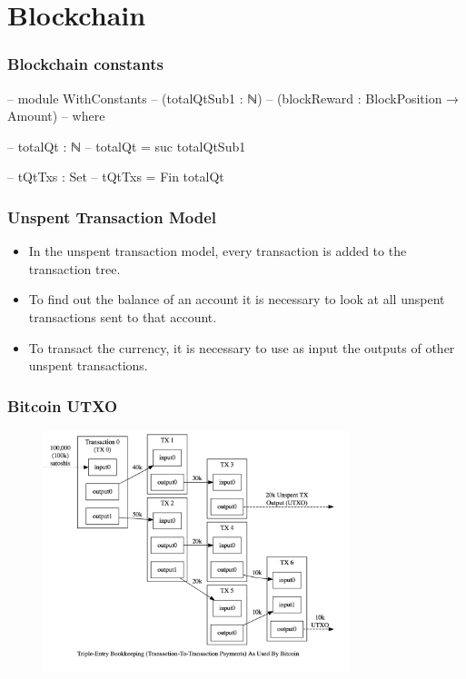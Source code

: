\documentclass{beamer}
\begin{document}
\section{Blockchain}

\begin{frame}
  \frametitle{Blockchain constants}
\begin{code}
    -- module WithConstants
    --   (totalQtSub1 : ℕ)
    --   (blockReward : BlockPosition → Amount)
    --   where

    --   totalQt : ℕ
    --   totalQt = suc totalQtSub1

    --   tQtTxs : Set
    --   tQtTxs = Fin totalQt
\end{code}
\end{frame}

\AgdaHide{
\begin{code}



\end{code}
}


\begin{frame}
   \frametitle{Unspent Transaction Model}
   \begin{itemize}[<+->]
     \item In the unspent transaction model, every transaction is added to the transaction tree.
     \item To find out the balance of an account it is necessary to look at all unspent transactions
       sent to that account.
     \item To transact the currency, it is necessary to use as input the outputs of
       other unspent transactions.
   \end{itemize}
\end{frame}

\begin{frame}
  \frametitle{Bitcoin UTXO}
    \includegraphics[width=11cm, height=7cm]{utxo}
\end{frame}
\end{document}
